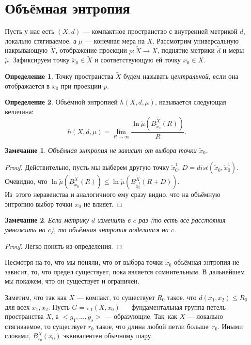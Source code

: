 \documentclass[11pt]{article}
\theoremstyle{definition}
\newtheorem{defin}{Определение}%
\theoremstyle{plain}
\theoremstyle{plain}
\newtheorem{remark}{Замечание}
\def\leq{\leqslant}
\def\wt#1{\widetilde{#1}}
\begin{document}
\section{Объёмная энтропия}
Пусть у нас есть $(X, d)$ --- компактное пространство с внутренней метрикой $d$, локально стягиваемое, 
а $\mu$ --- конечная мера на $X$. Рассмотрим универсальную накрывающую $\wt{X}$, отображение проекции $p : \wt{X} \rightarrow X$, 
поднятие метрики $\wt{d}$ и меры $\wt{\mu}$.
Зафиксируем точку $\wt{x}_0 \in \wt{X}$ и соответствующую ей точку $x_0 \in X$.
\begin{defin}
Точку пространства $\wt{X}$  будем называть {\it центральной}, если она отображается в $x_0$ при проекции $p$.
\end{defin}

\begin{defin}
	Объёмной энтропией $h(X, d, \mu)$, называется следующая величина:
	$$
	h(X, d, \mu) = \lim_{R \rightarrow \infty} \frac{\ln\wt{\mu}\left(B_{\wt{x}_0}^{\wt{X}}(R)\right)} {R}.
	$$
\end{defin}


\begin{remark}
Объёмная энтропия не зависит от выбора точки $\wt{x}_0$.
\end{remark}
\begin{proof}
Действительно, пусть мы выберем другую точку $\wt{x}^1_0$, $D = dist(\wt{x}_0, \wt{x}_0^1)$.
Очевидно, что $\ln\wt{\mu}\left(B_{\wt{x}_0}^{\wt{X}}(R)\right) \leq 
\ln\wt{\mu}\left(B_{\wt{x}_0^1}^{\wt{X}}(R + D)\right)$. \\
Из~этого неравенства и аналогичного ему сразу видно, 
что на объёмную энтропию выбор точки $\wt{x}_0$ не влияет.
\end{proof}

\begin{remark}
Если метрику $d$ изменить в $c$ раз (то есть все расстояния умножить на $c$), то объёмная энтропия поделится на $c$.
\end{remark}
\begin{proof}
Легко понять из определения.
\end{proof}

Несмотря на то, что мы поняли, что от выбора точки $\wt{x}_0$ объёмная энтропия не зависит, 
то, что предел существует, пока является сомнительным. В дальнейшем мы покажем, что он существует и ограничен.

Заметим, что так как $X$ --- компакт, то существует $R_0$ такое, что $d(x_1, x_2) \leq R_0$ для всех $x_1, x_2$.
Пусть $G = \pi_1(X, x_0)$ --- фундаментальная группа петель пространства $X$, а $<g_1,\dots,g_s>$ --- образующие.
Так~как $X$ --- локально стягиваемое, то существует $r_0$ такое, что длина любой петли больше~$r_0$. 
Иными словами, $B_{r_0}^X(x_0)$ эквивалентен обычному шару.
\end{document}
